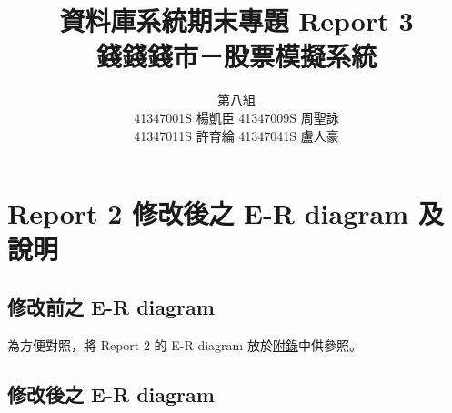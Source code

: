\documentclass[UTF8, a4paper, 12pt, fontset=none]{ctexart}
\title{\vspace{-2.5cm}資料庫系統期末專題 Report 3\\ \textbf{錢錢錢市－股票模擬系統}}
\author{
    \begin{tabular}{c}
        第八組 \\ 
        41347001S 楊凱臣 \quad 41347009S 周聖詠 \\ 
        41347011S 許育綸 \quad 41347041S 盧人豪
    \end{tabular}
}
\date{}
\begin{document}
\maketitle
    \vspace{-1cm}
    \section{Report 2 修改後之 E-R diagram 及 說明}
    \subsection{修改前之 E-R diagram}
    為方便對照，將 Report 2 的 E-R diagram 放於\hyperref[sec:appendix_er]{附錄}中供參照。
    
    \subsection{修改後之 E-R diagram}
\end{document}
